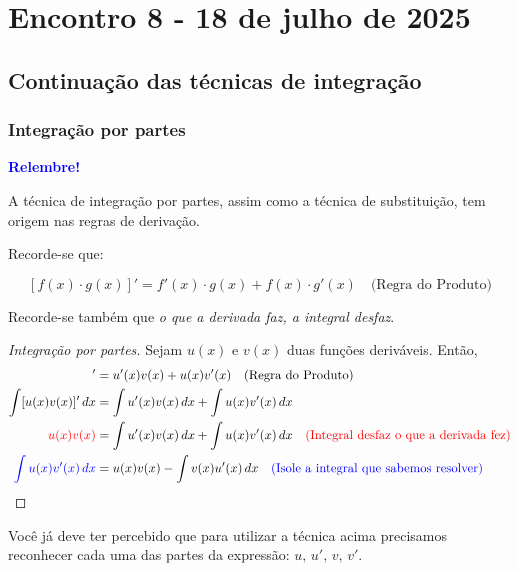 \documentclass[12pt,openright,twoside,a4paper]{article}
\theoremstyle{definition}
\begin{document}
	\pagebreak
	\section{Encontro 8 - 18 de julho de 2025}
	
	\subsection{Continuação das técnicas de integração}
	
	\subsubsection{Integração por partes}
	
	\begin{snugshade}
		\textbf{\textcolor{blue}{Relembre!}}
		
		A técnica de integração por partes, assim como a técnica de substituição, tem origem nas regras de derivação.
		
		Recorde-se que:
		
		\[
		[f(x) \cdot g(x)]' = f'(x)\cdot g(x) + f(x) \cdot g'(x) \quad \text{(Regra do Produto)}
		\]
		
		Recorde-se também que \textit{o que a derivada faz, a integral desfaz}.
	\end{snugshade}
	
	
	
	\begin{proof}[Integração por partes]
		
		Sejam $u(x)$ e $v(x)$ duas funções deriváveis. Então,
		\begin{align*}
			[u(x)v(x)]' &= u'(x)v(x) + u(x)v'(x) \quad \text{(Regra do Produto)}\\
			\int [u(x)v(x)]' \, dx &= \int u'(x)v(x) \, dx + \int u(x)v'(x) \, dx \\
			{\textcolor{red}{u(x)v(x)}} &= \int u'(x)v(x) \, dx + \int u(x)v'(x) \, dx \quad \text{\textcolor{red}{(Integral desfaz o que a derivada fez)}}\\
			{\textcolor{blue}{\int u(x)v'(x) \, dx}} &= u(x)v(x) - \int v(x)u'(x) \, dx \quad \text{\textcolor{blue}{(Isole a integral que sabemos resolver)}} \qedhere
		\end{align*}
	\end{proof}

	Você já deve ter percebido que para utilizar a técnica acima precisamos reconhecer cada uma das partes da expressão: $u,\, u', \, v, \, v'$.
	
\end{document}
